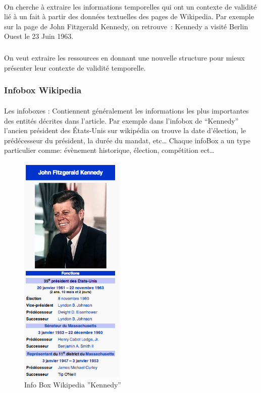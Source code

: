 \paragraph{}
On cherche à extraire les informations temporelles qui ont un contexte de validité lié à un fait à partir des données textuelles des pages de Wikipedia. 
Par exemple sur la page de John Fitzgerald Kennedy, on retrouve~:
\newline
Kennedy a visité Berlin Ouest le 23 Juin 1963.
\subparagraph{}
On veut extraire les ressources en donnant une nouvelle structure pour mieux présenter leur contexte de validité temporelle.
\subsubsection*{Infobox Wikipedia}
\paragraph{}
Les infoboxes : Contiennent généralement les informations les plus importantes des entités décrites dans l’article. Par exemple dans l’infobox de “Kennedy” l’ancien président des États-Unis sur wikipédia on trouve la date d’élection, le prédécesseur du président, la durée du mandat, etc…
\newline
Chaque infoBox a un type particulier comme: évènement historique, élection, compétition ect…
\begin{figure}[H]
        \centering
                \centering
                \includegraphics[width=5cm]{kennedy.png}
               \caption{Info Box Wikipedia ''Kennedy''}

\end{figure}
